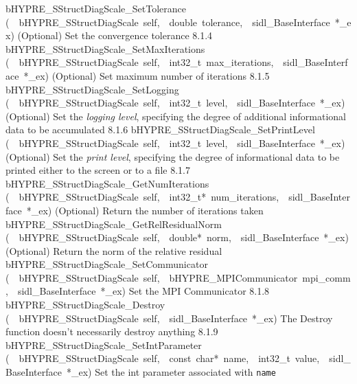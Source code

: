 \documentclass{article}
\begin{document}
\begin{cxxentry}
\begin{cxxentry}
\begin{cxxnames}
        {bHYPRE\_SStructDiagScale\_SetTolerance}
        {(\ \ bHYPRE\_SStructDiagScale\ self,\ \ double\ tolerance,\ \ sidl\_BaseInterface\ *\_ex)}
        {
(Optional) Set the convergence tolerance}
        {8.1.4}
        {bHYPRE\_SStructDiagScale\_SetMaxIterations}
        {(\ \ bHYPRE\_SStructDiagScale\ self,\ \ int32\_t\ max\_iterations,\ \ sidl\_BaseInterface\ *\_ex)}
        {
(Optional) Set maximum number of iterations}
        {8.1.5}
        {bHYPRE\_SStructDiagScale\_SetLogging}
        {(\ \ bHYPRE\_SStructDiagScale\ self,\ \ int32\_t\ level,\ \ sidl\_BaseInterface\ *\_ex)}
        {
(Optional) Set the {\it logging level}, specifying the degree
of additional informational data to be accumulated}
        {8.1.6}
        {bHYPRE\_SStructDiagScale\_SetPrintLevel}
        {(\ \ bHYPRE\_SStructDiagScale\ self,\ \ int32\_t\ level,\ \ sidl\_BaseInterface\ *\_ex)}
        {
(Optional) Set the {\it print level}, specifying the degree
of informational data to be printed either to the screen or
to a file}
        {8.1.7}
        {bHYPRE\_SStructDiagScale\_GetNumIterations}
        {(\ \ bHYPRE\_SStructDiagScale\ self,\ \ int32\_t*\ num\_iterations,\ \ sidl\_BaseInterface\ *\_ex)}
        {
(Optional) Return the number of iterations taken}
        {}
\label{cxx.8.1.15}
        {bHYPRE\_SStructDiagScale\_GetRelResidualNorm}
        {(\ \ bHYPRE\_SStructDiagScale\ self,\ \ double*\ norm,\ \ sidl\_BaseInterface\ *\_ex)}
        {
(Optional) Return the norm of the relative residual}
        {}
\label{cxx.8.1.16}
        {bHYPRE\_SStructDiagScale\_SetCommunicator}
        {(\ \ bHYPRE\_SStructDiagScale\ self,\ \ bHYPRE\_MPICommunicator\ mpi\_comm,\ \ sidl\_BaseInterface\ *\_ex)}
        {
Set the MPI Communicator}
        {8.1.8}
        {bHYPRE\_SStructDiagScale\_Destroy}
        {(\ \ bHYPRE\_SStructDiagScale\ self,\ \ sidl\_BaseInterface\ *\_ex)}
        {
The Destroy function doesn't necessarily destroy anything}
        {8.1.9}
        {bHYPRE\_SStructDiagScale\_SetIntParameter}
        {(\ \ bHYPRE\_SStructDiagScale\ self,\ \ const\ char*\ name,\ \ int32\_t\ value,\ \ sidl\_BaseInterface\ *\_ex)}
        {
Set the int parameter associated with {\tt name}}
        {}
\label{cxx.8.1.17}

\end{cxxnames}
\end{cxxentry}
\end{cxxentry}
\end{document}
